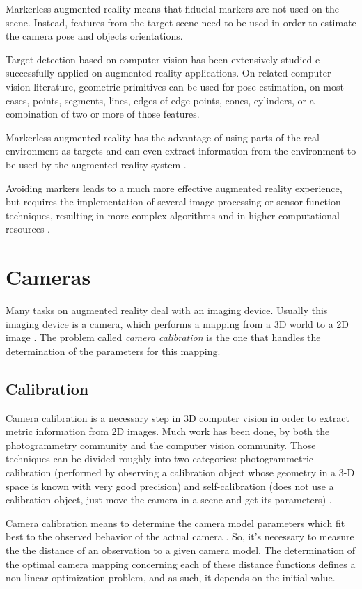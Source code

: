 \documentclass[msc, a4paper, classic, en]{ufbathesis}
\begin{document}
Markerless augmented reality means that fiducial markers are not used on the scene. Instead, features from the target scene need to be used in order to estimate the camera pose and objects orientations.

Target detection based on computer vision has been extensively studied e successfully applied on augmented reality applications. On related computer vision literature, geometric primitives can be used for pose estimation, on most cases, points, segments, lines, edges of edge points, cones, cylinders, or a combination of two or more of those features.

Markerless augmented reality has the advantage of using parts of the real environment as targets and can even extract information from the environment to be used by the augmented reality system \cite{39}.

Avoiding markers leads to a much more effective augmented reality experience, but requires the implementation of several image processing or sensor function techniques, resulting in more complex algorithms and in higher computational resources \cite{shumaker2011virtual}.

\section{Cameras}

Many tasks on augmented reality deal with an imaging device. Usually this imaging device is a camera, which performs a mapping from a 3D world to a 2D image \cite{hanning2011high}. The problem called \textit{camera calibration} is the one that handles the determination of the parameters for this mapping.

\subsection{Calibration}

Camera calibration is a necessary step in 3D computer vision in order to extract metric information from 2D images. Much work has been done, by both the photogrammetry community and the computer vision community. Those techniques can be divided roughly into two categories: photogrammetric calibration (performed by observing a calibration object whose geometry in a 3-D space is known with very good precision) and self-calibration (does not use a calibration object, just move the camera in a scene and get its parameters) \cite{zhang2000flexible}.

Camera calibration means to determine the camera model parameters which fit best to the observed behavior of the actual camera \cite{hanning2011high}. So, it's necessary to measure the the distance of an observation to a given camera model. The determination of the optimal camera mapping concerning each of these distance functions defines a non-linear optimization problem, and as such, it depends on the initial value.
\end{document}
